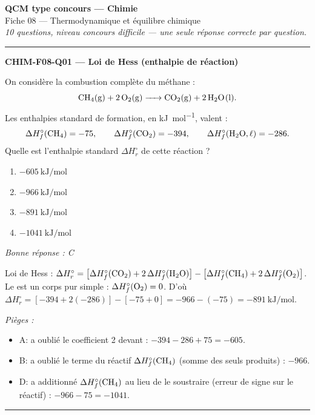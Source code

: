 \documentclass[11pt,a4paper]{article}
\begin{document}
\begin{center}
{\Large\bfseries QCM type concours --- Chimie}\\[2pt]
{\large Fiche 08 --- Thermodynamique et équilibre chimique}\\[2pt]
{\itshape 10 questions, niveau concours difficile --- une seule réponse correcte par question.}
\end{center}
\vspace{6pt}\hrule\vspace{10pt}

\noindent\textbf{CHIM-F08-Q01 --- Loi de Hess (enthalpie de réaction)}\par
On considère la combustion complète du méthane :
\[ \ce{CH4(g) + 2 O2(g) -> CO2(g) + 2 H2O(l)}. \]
Les enthalpies standard de formation, en \si{\kilo\joule\per\mol}, valent :
\[ \Delta H_f^{\circ}(\ce{CH4})=-75,\qquad \Delta H_f^{\circ}(\ce{CO2})=-394,\qquad \Delta H_f^{\circ}(\ce{H2O},\ell)=-286. \]
Quelle est l'enthalpie standard $\Delta H_r^{\circ}$ de cette réaction ?
\begin{enumerate}[label=\Alph*)]
\item $\qty{-605}{\kilo\joule\per\mol}$
\item $\qty{-966}{\kilo\joule\per\mol}$
\item $\qty{-891}{\kilo\joule\per\mol}$
\item $\qty{-1041}{\kilo\joule\per\mol}$
\end{enumerate}
\textit{Bonne réponse : C}\par
Loi de Hess : $\Delta H_r^{\circ}=\big[\Delta H_f^{\circ}(\ce{CO2})+2\,\Delta H_f^{\circ}(\ce{H2O})\big]-\big[\Delta H_f^{\circ}(\ce{CH4})+2\,\Delta H_f^{\circ}(\ce{O2})\big]$. Le  est un corps pur simple : $\Delta H_f^{\circ}(\ce{O2})=0$. D'où $\Delta H_r^{\circ}=[-394+2(-286)]-[-75+0]=-966-(-75)=\qty{-891}{\kilo\joule\per\mol}$.\par
\textit{Pièges :}
\begin{itemize}
\item A: a oublié le coefficient 2 devant  : $-394-286+75=-605$.
\item B: a oublié le terme du réactif $\Delta H_f^{\circ}(\ce{CH4})$ (somme des seuls produits) : $-966$.
\item D: a additionné $\Delta H_f^{\circ}(\ce{CH4})$ au lieu de le soustraire (erreur de signe sur le réactif) : $-966-75=-1041$.
\end{itemize}
\vspace{8pt}\hrule\vspace{8pt}
\end{document}

